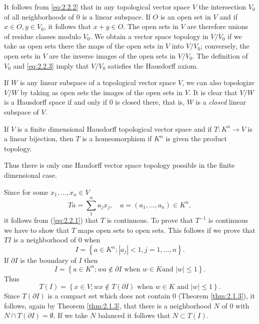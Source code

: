 It follows from \eqref{eq:2.2.2} that in any topological vector space
$V$ the intersection $V_0$ of all neighborhoods of $0$ is a linear
subspace. If $O$ is an open set in $V$ and if $x\in O, y\in V_0$, it
follows that $x+y\in O$. The open sets in $V$ are therefore unions of
residue classes modulo $V_0$. We obtain a vector space topology in
$V/V_0$ if we take as open sets there the maps of the open sets in $V$
into $V/V_0$; conversely, the open sets in $V$ are the inverse images
of the open sets in $V/V_0$. The definition of $V_0$ and
\eqref{eq:2.2.3} imply that $V/V_0$ satisfies the Hausdorff axiom.

If $W$ is any linear subspace of a topological vector space $V$, we
can also topologize $V/W$ by taking as open sets the images of the
open sets in $V$. It is clear that $V/W$ is a Hausdorff space if and
only if $0$ is closed there, that is, $W$ is a \emph{closed} linear
subspace of $V$.
\begin{thm}\label{thm:2.2.2}
  If $V$ is a finite dimensional Hausdorff topological vector space
  and if $T:K^n\to V$ is a linear bijection, then $T$ is a
  homeomorphism if $K^n$ is given the product topology.
\end{thm}
Thus there is only one Haudorff vector space topology possible in the
finite dimensional case.
\begin{prf}
  Since for some $x_1,\dots,x_n\in V$
  \begin{displaymath}
    Ta=\sum_1^na_jx_j,\quad a=\left( a_1,\dots,a_n \right)\in K^n,
  \end{displaymath}
  it follows from (\ref{eq:2.2.1}) that $T$ is continuous. To prove
  that $T^{-1}$ is continuous we have to show that $T$ maps open sets
  to open sets. This follows if we prove that $TI$ is a neighborhood
  of $0$ when
  \begin{displaymath}
    I=\left\{ a\in K^n;|a_j|<1,j=1,\dots,n \right\}.
  \end{displaymath}
  If $\partial I$ is the boundary of $I$ then
  \begin{displaymath}
    I=\left\{ a\in K^n;wa\notin\partial I \text{ when }w\in K\text{
        and }|w|\leq1 \right\}.
  \end{displaymath}
  Thus
  \begin{displaymath}
    T(I)=\left\{ x\in V;wx\notin T(\partial I)\text{ when }w\in
      K\text{ and }|w|\leq1 \right\}.
  \end{displaymath}
  Since $T(\partial I)$ is a compact set which does not contain $0$
  (Theorem \ref{thm:2.1.3}), it follows, again by Theorem
  \ref{thm:2.1.3}, that there is a neighborhood $N$ of $0$ with $N\cap
  T(\partial I)=\emptyset$. If we take $N$ balanced it follows that
  $N\subset T(I)$.
\end{prf}
